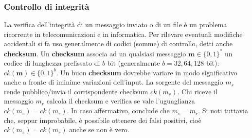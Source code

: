 \subsubsection{Controllo di integrità}
La verifica dell’integrità di un messaggio inviato o di un file è un problema ricorrente in telecomunicazioni e in informatica. Per rilevare eventuali modifiche accidentali si fa uso generalmente di codici (somme) di controllo, detti anche \textbf{checksum}. Un \textbf{checksum} associa ad un qualsiasi messaggio $\textbf{m} \in \{0,1\}^*$ un codice di lunghezza prefissato di $b$ bit (generalmente $b = 32,64,128$ bit): $ck(\textbf{m}) \in \{0,1\}^b$. Un buon \textbf{checksum} dovrebbe variare in modo significativo anche a fronte di iminime variazioni dell'input. \newline \newline 
La sorgente del messaggio $m_{s}$ rende pubblico/invia il corrispondente checksum $ck(m_{s})$. Chi riceve il messaggio $m_{r}$ calcola il checksum e verifica se vale l'uguaglianza $ck(m_{s}) = ck(m_{r})$. In caso affermativo, conclude che $m_{s} = m_{r}$. Si noti tuttavia che, seppur improbabile, è possibile ottenere dei falsi positivi, cioè $ck(m_{s}) = ck(m_{r} )$ anche se non è vero.

